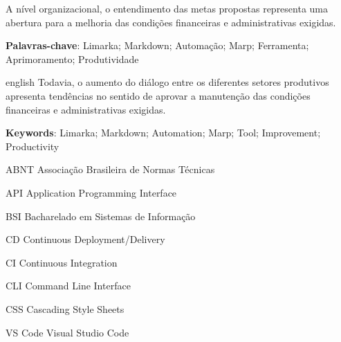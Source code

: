 \documentclass[
	12pt,				%
	oneside,			%
	a4paper,			%
	english,			%
	french,				%
	spanish,			%
	brazil				%
	]{abntex2}
\newcommand{\listasdousuario}{}
\begin{document}


\setlength{\absparsep}{18pt} %
\begin{resumo}

  A nível organizacional, o entendimento das metas propostas representa
  uma abertura para a melhoria das condições financeiras e administrativas
  exigidas.

 \textbf{Palavras-chave}: Limarka; Markdown; Automação; Marp; Ferramenta; Aprimoramento;
Produtividade
\end{resumo}



\begin{resumo}[Abstract]
 \begin{otherlanguage*}{english}
   Todavia, o aumento do diálogo entre os diferentes setores produtivos
   apresenta tendências no sentido de aprovar a manutenção das condições
   financeiras e administrativas exigidas.

   \vspace{\onelineskip}
 
   \noindent 
   \textbf{Keywords}: Limarka; Markdown; Automation; Marp; Tool; Improvement; Productivity
 \end{otherlanguage*}
\end{resumo}



\listoffigures*
\cleardoublepage



\listasdousuario

\begin{siglas}
  \item[ABNT] Associação Brasileira de Normas Técnicas
  \item[API] Application Programming Interface
  \item[BSI] Bacharelado em Sistemas de Informação
  \item[CD] Continuous Deployment/Delivery
  \item[CI] Continuous Integration
  \item[CLI] Command Line Interface
  \item[CSS] Cascading Style Sheets
  \item[VS Code] Visual Studio Code
\end{siglas}
\end{document}
